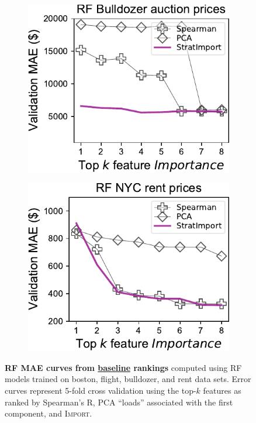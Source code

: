 \documentclass[11pt]{article}
\newcommand{\Impo}{\fontfamily{cmr}\textsc{Import}}
\begin{document}
\begin{figure}
\begin{subfigure}{.245\textwidth}
\includegraphics[scale=0.45]{images/bulldozer-topk-RF-baseline.pdf}
\subcaption{}
\end{subfigure}
\begin{subfigure}{.245\textwidth}
    \centering
\includegraphics[scale=0.45]{images/rent-topk-RF-baseline.pdf}
\subcaption{}
\end{subfigure} 
\caption{\small {\bf RF MAE curves from \underline{baseline} rankings} computed using RF models trained on boston, flight, bulldozer, and rent data sets. Error curves represent 5-fold cross validation using the top-$k$ features as ranked by Spearman's R, PCA ``loads'' associated with the first component, and \Impo{}.}
\label{fig:baseline}
\end{figure}
\end{document}
